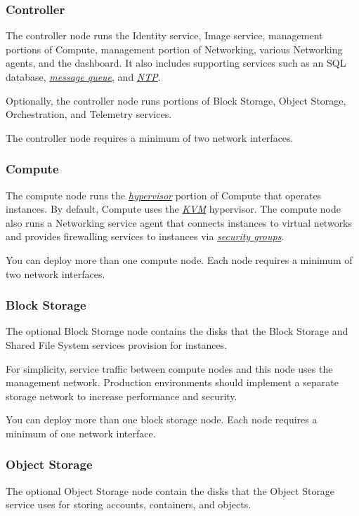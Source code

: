 \documentclass[letterpaper,10pt,english]{sphinxmanual}
\begin{document}
\subsubsection{Controller}
\label{_source/installation_guide/overview:controller}
The controller node runs the Identity service, Image service, management
portions of Compute, management portion of Networking, various Networking
agents, and the dashboard. It also includes supporting services such as
an SQL database, {\hyperref[_source/glossary:term-message-queue]{\emph{message queue}}}, and {\hyperref[_source/glossary:term-ntp]{\emph{NTP}}}.

Optionally, the controller node runs portions of Block Storage, Object
Storage, Orchestration, and Telemetry services.

The controller node requires a minimum of two network interfaces.


\subsubsection{Compute}
\label{_source/installation_guide/overview:id1}
The compute node runs the {\hyperref[_source/glossary:term-hypervisor]{\emph{hypervisor}}} portion of Compute that
operates instances. By default, Compute uses the
{\hyperref[_source/glossary:term-kernel-based-vm-kvm]{\emph{KVM}}} hypervisor. The compute node also
runs a Networking service agent that connects instances to virtual networks
and provides firewalling services to instances via
{\hyperref[_source/glossary:term-security-group]{\emph{security groups}}}.

You can deploy more than one compute node. Each node requires a minimum
of two network interfaces.


\subsubsection{Block Storage}
\label{_source/installation_guide/overview:id2}
The optional Block Storage node contains the disks that the Block
Storage and Shared File System services provision for instances.

For simplicity, service traffic between compute nodes and this node
uses the management network. Production environments should implement
a separate storage network to increase performance and security.

You can deploy more than one block storage node. Each node requires a
minimum of one network interface.


\subsubsection{Object Storage}
\label{_source/installation_guide/overview:id3}
The optional Object Storage node contain the disks that the
Object Storage service uses for storing accounts, containers, and
objects.
\end{document}
